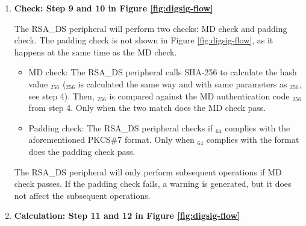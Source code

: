 \documentclass[main\_\_EN.tex]{subfiles}
\begin{document}
\begin{enumerate}
    \item {\bfseries Check: Step 9 and 10 in Figure \ref{fig:digsig-flow}}

        The RSA\_DS peripheral will perform two checks: MD check and padding check. The padding check is not shown in Figure \ref{fig:digsig-flow}, as it happens at the same time as the MD check.

        \begin{itemize}

            \item MD check: The RSA\_DS peripheral calls SHA-256 to calculate the hash value \begin{math}[CALC\_MD]_{256}\end{math} (\begin{math}[CALC\_MD]_{256}\end{math} is calculated the same way and with same parameters as \begin{math}[MD]_{256}\end{math}, see step 4). Then, \begin{math}[CALC\_MD]_{256}\end{math} is compared against the MD authentication code \begin{math}[MD]_{256}\end{math} from step 4. Only when the two match does the MD check pass.

            \item Padding check: The RSA\_DS peripheral checks if \begin{math}[\beta]_{64} \end{math} complies with the aforementioned PKCS\#7 format. Only when \begin{math}[\beta]_{64} \end{math} complies with the format does the padding check pass.

        \end{itemize}

        The RSA\_DS peripheral will only perform subsequent operations if MD check passes. If the padding check fails, a warning is generated, but it does not affect the subsequent operations.

    \item {\bfseries Calculation: Step 11 and 12 in Figure \ref{fig:digsig-flow}}


\end{enumerate}
\end{document}
